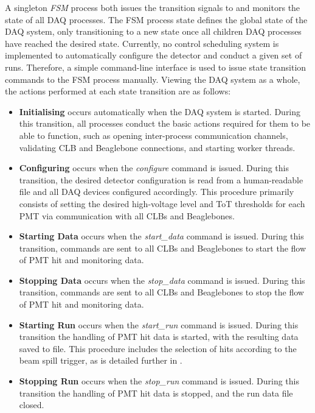 A singleton \emph{FSM} process both issues the transition signals to and monitors the state of all
DAQ processes. The FSM process state defines the global state of the DAQ system, only
transitioning to a new state once all children DAQ processes have reached the desired state.
Currently, no control scheduling system is implemented to automatically configure the detector and
conduct a given set of runs. Therefore, a simple command-line interface is used to issue state
transition commands to the FSM process manually. Viewing the DAQ system as a whole, the actions
performed at each state transition are as follows:
\begin{itemize}
    \item \textbf{Initialising} occurs automatically when the DAQ system is started. During this
    transition, all processes conduct the basic actions required for them to be able to function,
    such as opening inter-process communication channels, validating CLB and Beaglebone
    connections, and starting worker threads.
    \item \textbf{Configuring} occurs when the \emph{configure} command is issued. During this
    transition, the desired detector configuration is read from a human-readable file and all DAQ
    devices configured accordingly. This procedure primarily consists of setting the desired
    high-voltage level and ToT thresholds for each PMT via communication with all CLBs and
    Beaglebones.
    \item \textbf{Starting Data} occurs when the \emph{start\_data} command is issued. During this
    transition, commands are sent to all CLBs and Beaglebones to start the flow of PMT hit and
    monitoring data.
    \item \textbf{Stopping Data} occurs when the \emph{stop\_data} command is issued. During this
    transition, commands are sent to all CLBs and Beaglebones to stop the flow of PMT hit and
    monitoring data.
    \item \textbf{Starting Run} occurs when the \emph{start\_run} command is issued. During this
    transition the handling of PMT hit data is started, with the resulting data saved to file.
    This procedure includes the selection of hits according to the \numi beam spill trigger, as is
    detailed further in .
    \item \textbf{Stopping Run} occurs when the \emph{stop\_run} command is issued. During this
    transition the handling of PMT hit data is stopped, and the run data file closed.
\end{itemize}


